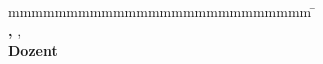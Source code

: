 \begin{titlepage}
\begin{center}
		\vspace*{3mm}		{\textbf \abschluss}\\
		\vspace*{12mm}	\langartikelstudiengang{} \langstudiengang{} \studiengang\\
    \vspace*{3mm}		\langanderdh{} \dhbw\\
		\vspace*{12mm}	\langvon\\
		\vspace*{3mm}		{\large\textbf \autor}\\
		\vspace*{12mm}	\datumAbgabe\\
	\end{center}
	\vfill
	\begin{spacing}{1.2}
	\begin{tabbing}
		mmmmmmmmmmmmmmmmmmmmmmmmmm             \= \kill
		\textbf{\langdbbearbeitungszeit}       \>  \zeitraum\\
		\textbf{\langdbmatriknr, \langdbkurs}  \>  \martrikelnr, \kurs\\
		\textbf{Dozent}               \>  \betreuer\\
	\end{tabbing}
	\end{spacing}
\end{titlepage}
